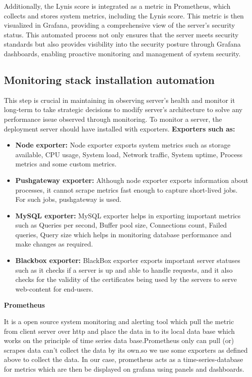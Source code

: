 \documentclass[12pt,a4paper,oneside]{report}
\begin{document}
Additionally, the Lynis score is integrated as a metric in Prometheus, which collects and stores system metrics, including the Lynis score. This metric is then visualized in Grafana, providing a comprehensive view of the server's security status. This automated process not only ensures that the server meets security standards but also provides visibility into the security posture through Grafana dashboards, enabling proactive monitoring and management of system security.

\subsection{Monitoring stack installation automation}
This step is crucial in maintaining in observing server's health and monitor it long-term to take strategic decisions to modify server's architecture to solve any performance issue observed through monitoring. To monitor a server, the deployment server should have installed with exporters.
\textbf{Exporters such as: }
\begin{itemize}
	\item \textbf{Node exporter: } Node exporter exports system metrics such as storage available, CPU usage, System load, Network traffic, System uptime, Process metrics and some custom metrics.
	\item \textbf{Pushgateway exporter: } Although node exporter exports information about processes, it cannot scrape metrics fast enough to capture short-lived jobs. For such jobs, pushgateway is used.
	\item \textbf{MySQL exporter: } MySQL exporter helps in exporting important metrics such as Queries per second, Buffer pool size, Connections count, Failed queries, Query size which helps in monitoring database performance and make changes as required.
	\item \textbf{Blackbox exporter: } BlackBox exporter exports important server statuses such as it checks if a server is up and able to handle requests, and it also checks for the validity of the certificates being used by the servers to serve web-content for end-users.
\end{itemize}
\hspace{1cm}\textbf{{\Large Prometheus}}

\par\hspace{1cm}It is a open source system monitoring and alerting tool which pull the metric from client server over http and place the data in to its local data base which works on the principle of time series data base.Prometheus only can pull (or) scrapes data can’t collect the data by its own.so we use some exporters as defined above to collect the data. In our case, prometheus acts as a time-series-database for metrics which are then be displayed on grafana using panels and dashboards.
\end{document}
